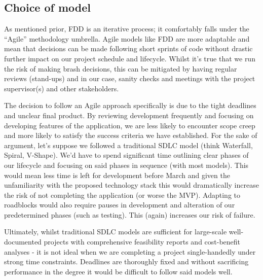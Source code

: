 \subsection{Choice of model}
As mentioned prior, FDD is an iterative process; it comfortably falls under the ``Agile'' methodology umbrella.
Agile models like FDD are more adaptable and mean that decisions can be made following short sprints of code without
drastic further impact on our project schedule and lifecycle. Whilst it's true that we run the risk of
making brash decisions, this can be mitigated by having regular reviews (stand-ups) and
in our case, sanity checks and meetings with the project supervisor(s) and other stakeholders.
\par
The decision to follow an Agile approach specifically is due to the tight deadlines and
unclear final product. By reviewing development frequently and focusing on developing features of the application, we are
less likely to encounter scope creep and more likely to satisfy the success criteria we have established.
For the sake of argument, let's suppose we followed a traditional SDLC model (think Waterfall, Spiral, V-Shape).
We'd have to spend significant time outlining clear phases of our lifecycle and focusing on said phases in sequence (with most models).
This would mean less time is left for development before March and given the unfamiliarity with
the proposed technology stack this would dramatically increase the risk of not completing the application (or worse the MVP).
Adapting to roadblocks would also require pauses in development and alteration of our
predetermined phases (such as testing). This (again) increases our risk of failure.
\par
Ultimately, whilst traditional SDLC models are sufficient for large-scale well-documented projects with
comprehensive feasibility reports and cost-benefit analyses - it is not ideal
when we are completing a project single-handedly under strong time constraints.
Deadlines are thoroughly fixed and without sacrificing performance
in the degree it would be difficult to follow said models well.
\pagebreak

